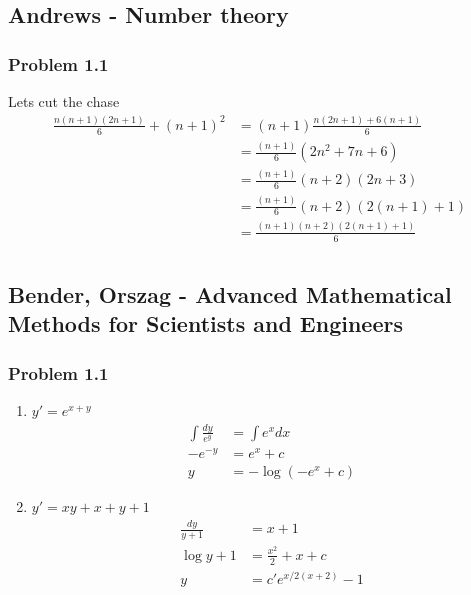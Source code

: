 \documentclass[10pt,a4paper]{article}
\theoremstyle{definition}
\begin{document}
\subsection{{\sc Andrews} - Number theory}
\subsubsection{Problem 1.1}
Lets cut the chase
\begin{align}
\frac{n(n+1)(2n+1)}{6}+(n+1)^2
&=(n+1)\frac{n(2n+1)+6(n+1)}{6}\\
&=\frac{(n+1)}{6}(2n^2+7n+6)\\
&=\frac{(n+1)}{6}(n+2)(2n+3)\\
&=\frac{(n+1)}{6}(n+2)(2(n+1)+1)\\
&=\frac{(n+1)(n+2)(2(n+1)+1)}{6}\\
\end{align}

\subsection{{\sc Bender, Orszag} - Advanced Mathematical Methods for Scientists and Engineers}
\subsubsection{Problem 1.1}
\begin{enumerate}
    \item $y'=e^{x+y}$
    \begin{align}
        \int\frac{dy}{e^y}&=\int e^xdx\\
        -e^{-y}&=e^x+c\\
        y&=-\log\left(-e^x+c\right)
    \end{align}
    \item $y'=xy+x+y+1$
    \begin{align}
        \frac{dy}{y+1}&=x+1\\
        \log y+1&=\frac{x^2}{2}+x+c\\
        y&=c'e^{x/2(x+2)}-1
    \end{align}
\end{enumerate}
\end{document}
